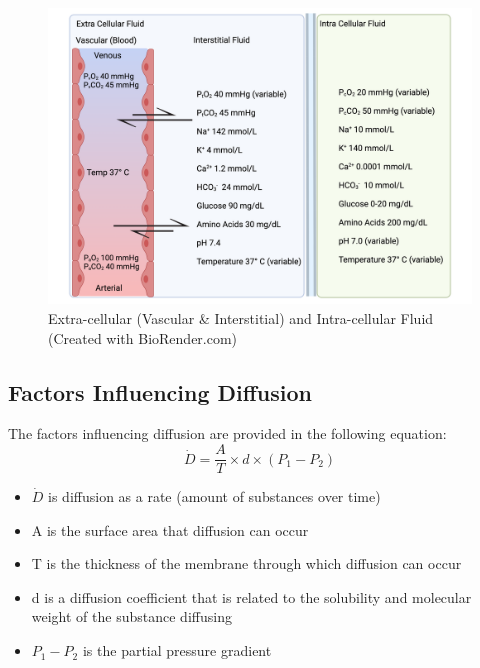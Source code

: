\begin{figure}[!h]
    \centering
    \includegraphics[width=1.0\linewidth]{./figure/ecf.png}
    \caption{Extra-cellular (Vascular \& Interstitial) and Intra-cellular Fluid \footnotesize{(Created with BioRender.com)}}
    \label{fig:ecf_respiration}
\end{figure}


\subsection{Factors Influencing Diffusion}

The factors influencing diffusion are provided in the following equation:
\vspace{4 mm}
\begin{equation}
    \dot{D} = \frac{A}{T} \times d \times (P_1 - P_2)
    \label{diffusion}
\end{equation}
\vspace{4mm}

\begin{itemize}
    \item $\dot{D}$ is diffusion as a rate (amount of substances over time)
    \item A is the surface area that diffusion can occur
    \item T is the thickness of the membrane through which diffusion can occur
    \item d is a diffusion coefficient that is related to the solubility and molecular weight of the substance diffusing
    \item $P_1 - P_2$ is the partial pressure gradient
\end{itemize}

